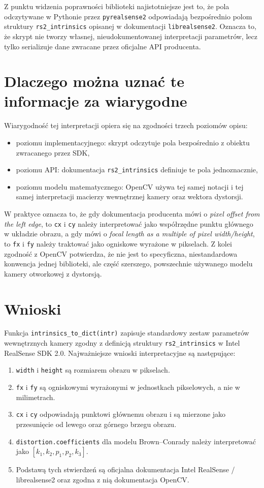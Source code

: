 \documentclass[12pt,a4paper]{report}
\begin{document}
Z punktu widzenia poprawności biblioteki najistotniejsze jest to, że pola odczytywane w Pythonie
przez \texttt{pyrealsense2} odpowiadają bezpośrednio polom struktury \texttt{rs2\_intrinsics}
opisanej w dokumentacji \texttt{librealsense2}. Oznacza to, że skrypt nie tworzy własnej,
nieudokumentowanej interpretacji parametrów, lecz tylko serializuje dane zwracane przez oficjalne
API producenta.

\section{Dlaczego można uznać te informacje za wiarygodne}
Wiarygodność tej interpretacji opiera się na zgodności trzech poziomów opisu:
\begin{itemize}
    \item poziomu implementacyjnego: skrypt odczytuje pola bezpośrednio z obiektu zwracanego przez SDK,
    \item poziomu API: dokumentacja \texttt{rs2\_intrinsics} definiuje te pola jednoznacznie,
    \item poziomu modelu matematycznego: OpenCV używa tej samej notacji i tej samej interpretacji
        macierzy wewnętrznej kamery oraz wektora dystorsji.
\end{itemize}

W praktyce oznacza to, że gdy dokumentacja producenta mówi o \emph{pixel offset from the left edge},
to \texttt{cx} i \texttt{cy} należy interpretować jako współrzędne punktu głównego w układzie
obrazu, a gdy mówi o \emph{focal length as a multiple of pixel width/height}, to \texttt{fx}
i \texttt{fy} należy traktować jako ogniskowe wyrażone w pikselach. Z kolei zgodność z OpenCV
potwierdza, że nie jest to specyficzna, niestandardowa konwencja jednej biblioteki, ale część
szerszego, powszechnie używanego modelu kamery otworkowej z dystorsją.

\section{Wnioski}
Funkcja \texttt{intrinsics\_to\_dict(intr)} zapisuje standardowy zestaw parametrów
wewnętrznych kamery zgodny z definicją struktury \texttt{rs2\_intrinsics} w Intel RealSense
SDK 2.0. Najważniejsze wnioski interpretacyjne są następujące:
\begin{enumerate}
    \item \texttt{width} i \texttt{height} są rozmiarem obrazu w pikselach.
    \item \texttt{fx} i \texttt{fy} są ogniskowymi wyrażonymi w jednostkach pikselowych,
          a nie w milimetrach.
    \item \texttt{cx} i \texttt{cy} odpowiadają punktowi głównemu obrazu i są mierzone jako
          przesunięcie od lewego oraz górnego brzegu obrazu.
    \item \texttt{distortion.coefficients} dla modelu Brown--Conrady należy interpretować jako
          $[k_1, k_2, p_1, p_2, k_3]$.
    \item Podstawą tych stwierdzeń są oficjalna dokumentacja Intel RealSense / librealsense2
        oraz zgodna z nią dokumentacja OpenCV.
\end{enumerate}
\end{document}
